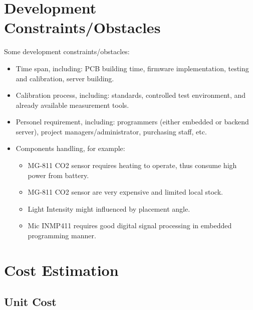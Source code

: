 \documentclass[a4paper,12pt,oneside,pdflatex,italian,final,twocolumn]{article}
\begin{document}
	\raggedright
	\section{Development Constraints/Obstacles}

	Some development constraints/obstacles:

	\begin{itemize}
		\item Time span, including: PCB building time, firmware implementation, testing and calibration, server building.

		\item Calibration process, including: standards, controlled test environment, and already available measurement tools.

		\item Personel requirement, including: programmers (either embedded or backend server), project managers/administrator, purchasing staff, etc.

		\item Components handling, for example:

		\begin{itemize}
			\item MG-811 CO2 sensor requires heating to operate, thus consume high power from battery.

			\item MG-811 CO2 sensor are very expensive and limited local stock.

			\item Light Intensity might influenced by placement angle.

			\item Mic INMP411 requires good digital signal processing in embedded programming manner.
		\end{itemize}

	\end{itemize}

	\raggedright
	\section{Cost Estimation}

	\subsection{Unit Cost}
\end{document}
